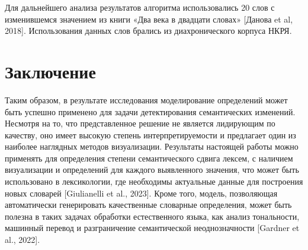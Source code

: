 \documentclass[LI,VKR]{HSEUniversity}
\begin{document}
Для дальнейшего анализа результатов алгоритма использовались 20 слов с изменившемся
значением из книги «Два века в двадцати словах» [Данова et al, 2018].
Использования данных слов брались из диахронического корпуса НКРЯ.

\chapter*{Заключение}

Таким образом, в результате исследования моделирование определений может быть
успешно применено для задачи детектирования семантических изменений.
Несмотря на то, что представленное решение не является лидирующим по качеству,
оно имеет высокую степень интерпретируемости и предлагает один
из наиболее наглядных методов визуализации.
Результаты настоящей работы можно применять для определения степени семантического сдвига лексем,
с наличием визуализации и определений для каждого выявленного значения,
что может быть использовано в лексикологии,
где необходимы актуальные данные для построения новых словарей [Giulianelli et al., 2023].
Кроме того, модель, позволяющая автоматически генерировать качественные словарные определения,
может быть полезна в таких задачах обработки естественного языка,
как анализ тональности, машинный перевод и разграничение семантической неоднозначности [Gardner et al., 2022].


\printbibliography
\end{document}
